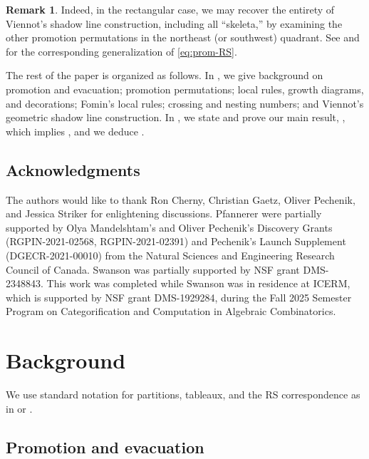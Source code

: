 \documentclass{amsart}
\theoremstyle{definition}
\newtheorem{remark}[theorem]{Remark}
\begin{document}
\begin{remark}\label{rem:this}
    Indeed, in the rectangular case, we may recover the entirety of Viennot's shadow line construction, including all ``skeleta,'' by examining the other promotion permutations in the northeast (or southwest) quadrant. See  and  for the corresponding generalization of \eqref{eq:prom-RS}.
\end{remark}

The rest of the paper is organized as follows. In , we give background on promotion and evacuation; promotion permutations; local rules, growth diagrams, and decorations; Fomin's local rules; crossing and nesting numbers; and Viennot's geometric shadow line construction. In , we state and prove our main result, , which implies , and we deduce .

\subsection{Acknowledgments}

The authors would like to thank Ron Cherny, Christian Gaetz, Oliver Pechenik, and Jessica Striker for enlightening discussions. Pfannerer were partially supported by Olya Mandelshtam's and Oliver Pechenik's Discovery Grants (RGPIN-2021-02568, RGPIN-2021-02391) and Pechenik's Launch Supplement (DGECR-2021-00010) from the Natural Sciences and Engineering Research Council of Canada. Swanson was partially supported by NSF grant DMS-2348843. This work was completed while Swanson was in residence at ICERM, which is supported by NSF grant DMS-1929284, during the Fall 2025 Semester Program on Categorification and Computation in Algebraic Combinatorics.

\section{Background}\label{sec:background}
We use standard notation for partitions, tableaux, and the RS correspondence as in \cite[Ch.~7]{Stanley:EC2} or \cite[Ch.~3]{Sagan-symmetric-group}. 

\subsection{Promotion and evacuation}\label{sec:background-promotion-evacuation}
\end{document}
